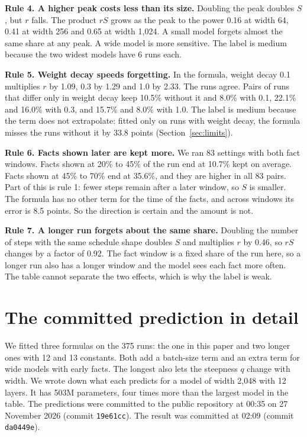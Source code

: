 \documentclass{article}
\begin{document}
\textbf{Rule 4. A higher peak costs less than its size.} Doubling the peak doubles $S$, but $r$ falls. The product $rS$ grows as the peak to the power 0.16 at width 64, 0.41 at width 256 and 0.65 at width 1,024. A small model forgets almost the same share at any peak. A wide model is more sensitive. The label is medium because the two widest models have 6 runs each.

\textbf{Rule 5. Weight decay speeds forgetting.} In the formula, weight decay 0.1 multiplies $r$ by 1.09, 0.3 by 1.29 and 1.0 by 2.33. The runs agree. Pairs of runs that differ only in weight decay keep 10.5\% without it and 8.0\% with 0.1, 22.1\% and 16.0\% with 0.3, and 15.7\% and 8.0\% with 1.0. The label is medium because the term does not extrapolate: fitted only on runs with weight decay, the formula misses the runs without it by 33.8 points (Section~\ref{sec:limits}).

\textbf{Rule 6. Facts shown later are kept more.} We ran 83 settings with both fact windows. Facts shown at 20\% to 45\% of the run end at 10.7\% kept on average. Facts shown at 45\% to 70\% end at 35.6\%, and they are higher in all 83 pairs. Part of this is rule 1: fewer steps remain after a later window, so $S$ is smaller. The formula has no other term for the time of the facts, and across windows its error is 8.5 points. So the direction is certain and the amount is not.

\textbf{Rule 7. A longer run forgets about the same share.} Doubling the number of steps with the same schedule shape doubles $S$ and multiplies $r$ by 0.46, so $rS$ changes by a factor of 0.92. The fact window is a fixed share of the run here, so a longer run also has a longer window and the model sees each fact more often. The table cannot separate the two effects, which is why the label is weak.

\section{The committed prediction in detail}
\label{app:prediction}

We fitted three formulas on the 375 runs: the one in this paper and two longer ones with 12 and 13 constants. Both add a batch-size term and an extra term for wide models with early facts. The longest also lets the steepness $q$ change with width. We wrote down what each predicts for a model of width 2,048 with 12 layers. It has 503M parameters, four times more than the largest model in the table. The predictions were committed to the public repository at 00:35 on 27 November 2026 (commit \texttt{19e61cc}). The result was committed at 02:09 (commit \texttt{da0449e}).
\end{document}
